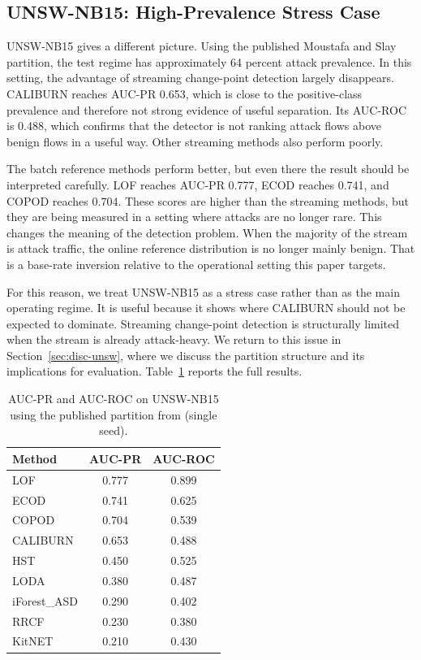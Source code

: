 \documentclass[preprint,12pt,authoryear]{elsarticle}
\newcommand{\caliburn}{CALIBURN}
\begin{document}
\subsection{UNSW-NB15: High-Prevalence Stress Case}
\label{sec:results-unsw}

UNSW-NB15 gives a different picture. Using the published Moustafa and Slay partition, the test regime has approximately 64 percent attack prevalence. In this setting, the advantage of streaming change-point detection largely disappears. \caliburn{} reaches AUC-PR 0.653, which is close to the positive-class prevalence and therefore not strong evidence of useful separation. Its AUC-ROC is 0.488, which confirms that the detector is not ranking attack flows above benign flows in a useful way. Other streaming methods also perform poorly.

The batch reference methods perform better, but even there the result should be interpreted carefully. LOF reaches AUC-PR 0.777, ECOD reaches 0.741, and COPOD reaches 0.704. These scores are higher than the streaming methods, but they are being measured in a setting where attacks are no longer rare. This changes the meaning of the detection problem. When the majority of the stream is attack traffic, the online reference distribution is no longer mainly benign. That is a base-rate inversion relative to the operational setting this paper targets.

For this reason, we treat UNSW-NB15 as a stress case rather than as the main operating regime. It is useful because it shows where \caliburn{} should not be expected to dominate. Streaming change-point detection is structurally limited when the stream is already attack-heavy. We return to this issue in Section~\ref{sec:disc-unsw}, where we discuss the partition structure and its implications for evaluation. Table~\ref{tab:unsw-results} reports the full results.

\begin{table}[ht]
\centering
\caption{AUC-PR and AUC-ROC on UNSW-NB15 using the published partition from \citet{moustafa2015unsw} (single seed).}
\label{tab:unsw-results}
\begin{tabular}{lcc}
\toprule
Method        & AUC-PR  & AUC-ROC \\
\midrule
LOF           & 0.777   & 0.899   \\
ECOD          & 0.741   & 0.625   \\
COPOD         & 0.704   & 0.539   \\
\caliburn{}   & 0.653   & 0.488   \\
HST           & 0.450   & 0.525   \\
LODA          & 0.380   & 0.487   \\
iForest\_ASD  & 0.290   & 0.402   \\
RRCF          & 0.230   & 0.380   \\
KitNET        & 0.210   & 0.430   \\
\bottomrule
\end{tabular}
\end{table}
\end{document}
